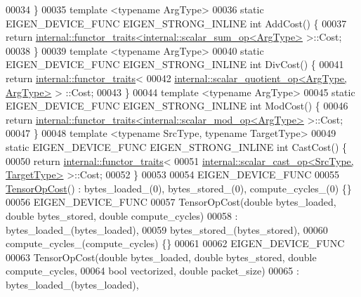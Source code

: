 \begin{DoxyCode}
00034   \}
00035   \textcolor{keyword}{template} <\textcolor{keyword}{typename} ArgType>
00036   \textcolor{keyword}{static} EIGEN\_DEVICE\_FUNC EIGEN\_STRONG\_INLINE \textcolor{keywordtype}{int} AddCost() \{
00037     \textcolor{keywordflow}{return} \hyperlink{struct_eigen_1_1internal_1_1functor__traits}{internal::functor\_traits<internal::scalar\_sum\_op<ArgType>}
       >::Cost;
00038   \}
00039   \textcolor{keyword}{template} <\textcolor{keyword}{typename} ArgType>
00040   \textcolor{keyword}{static} EIGEN\_DEVICE\_FUNC EIGEN\_STRONG\_INLINE \textcolor{keywordtype}{int} DivCost() \{
00041     \textcolor{keywordflow}{return} \hyperlink{struct_eigen_1_1internal_1_1functor__traits}{internal::functor\_traits}<
00042         \hyperlink{struct_eigen_1_1internal_1_1scalar__quotient__op}{internal::scalar\_quotient\_op<ArgType, ArgType>} >
      ::Cost;
00043   \}
00044   \textcolor{keyword}{template} <\textcolor{keyword}{typename} ArgType>
00045   \textcolor{keyword}{static} EIGEN\_DEVICE\_FUNC EIGEN\_STRONG\_INLINE \textcolor{keywordtype}{int} ModCost() \{
00046     \textcolor{keywordflow}{return} \hyperlink{struct_eigen_1_1internal_1_1functor__traits}{internal::functor\_traits<internal::scalar\_mod\_op<ArgType>}
       >::Cost;
00047   \}
00048   \textcolor{keyword}{template} <\textcolor{keyword}{typename} SrcType, \textcolor{keyword}{typename} TargetType>
00049   \textcolor{keyword}{static} EIGEN\_DEVICE\_FUNC EIGEN\_STRONG\_INLINE \textcolor{keywordtype}{int} CastCost() \{
00050     \textcolor{keywordflow}{return} \hyperlink{struct_eigen_1_1internal_1_1functor__traits}{internal::functor\_traits}<
00051         \hyperlink{struct_eigen_1_1internal_1_1scalar__cast__op}{internal::scalar\_cast\_op<SrcType, TargetType>} >::Cost;
00052   \}
00053 
00054   EIGEN\_DEVICE\_FUNC
00055   \hyperlink{class_eigen_1_1_tensor_op_cost}{TensorOpCost}() : bytes\_loaded\_(0), bytes\_stored\_(0), compute\_cycles\_(0) \{\}
00056   EIGEN\_DEVICE\_FUNC
00057   TensorOpCost(\textcolor{keywordtype}{double} bytes\_loaded, \textcolor{keywordtype}{double} bytes\_stored, \textcolor{keywordtype}{double} compute\_cycles)
00058       : bytes\_loaded\_(bytes\_loaded),
00059         bytes\_stored\_(bytes\_stored),
00060         compute\_cycles\_(compute\_cycles) \{\}
00061 
00062   EIGEN\_DEVICE\_FUNC
00063   TensorOpCost(\textcolor{keywordtype}{double} bytes\_loaded, \textcolor{keywordtype}{double} bytes\_stored, \textcolor{keywordtype}{double} compute\_cycles,
00064                \textcolor{keywordtype}{bool} vectorized, \textcolor{keywordtype}{double} packet\_size)
00065       : bytes\_loaded\_(bytes\_loaded),

\end{DoxyCode}
